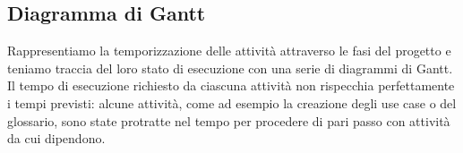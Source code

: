 \subsection{Diagramma di Gantt}

Rappresentiamo la temporizzazione delle attivit\`a attraverso le fasi del progetto e teniamo traccia del loro stato di esecuzione con una serie di diagrammi di Gantt.
Il tempo di esecuzione richiesto da ciascuna attivit\`a non rispecchia perfettamente i tempi previsti: alcune attivit\`a, come ad esempio la creazione degli use case o del glossario, sono state protratte nel tempo per procedere di pari passo con attivit\`a da cui dipendono.


